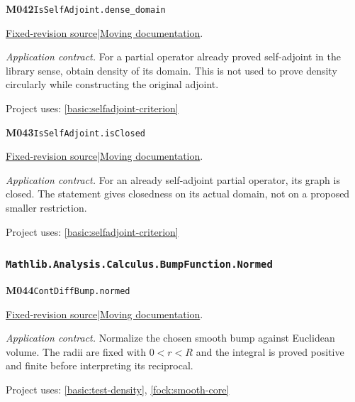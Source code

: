 \documentclass[11pt,a4paper]{article}
\theoremstyle{definition}
\theoremstyle{remark}
\begin{document}
\noindent\textbf{M042}\label{base:M042}\quad\nolinkurl{IsSelfAdjoint.dense_domain}

\href{https://github.com/leanprover-community/mathlib4/blob/9bac2d0692944a775113f7c130fd5e5b4608a854/Mathlib/Analysis/InnerProductSpace/LinearPMap.lean}{Fixed-revision source}\quad|\quad\href{https://leanprover-community.github.io/mathlib4_docs/Mathlib/Analysis/InnerProductSpace/LinearPMap.html#IsSelfAdjoint.dense_domain}{Moving documentation}.\par
\noindent\textit{Application contract.} For a partial operator already proved self-adjoint in the library sense, obtain density of its domain. This is not used to prove density circularly while constructing the original adjoint.\par
{\small Project uses: \ref{basic:selfadjoint-criterion}}\par\medskip

\noindent\textbf{M043}\label{base:M043}\quad\nolinkurl{IsSelfAdjoint.isClosed}

\href{https://github.com/leanprover-community/mathlib4/blob/9bac2d0692944a775113f7c130fd5e5b4608a854/Mathlib/Analysis/InnerProductSpace/LinearPMap.lean}{Fixed-revision source}\quad|\quad\href{https://leanprover-community.github.io/mathlib4_docs/Mathlib/Analysis/InnerProductSpace/LinearPMap.html#IsSelfAdjoint.isClosed}{Moving documentation}.\par
\noindent\textit{Application contract.} For an already self-adjoint partial operator, its graph is closed. The statement gives closedness on its actual domain, not on a proposed smaller restriction.\par
{\small Project uses: \ref{basic:selfadjoint-criterion}}\par\medskip

\subsubsection*{\nolinkurl{Mathlib.Analysis.Calculus.BumpFunction.Normed}}
\noindent\textbf{M044}\label{base:M044}\quad\nolinkurl{ContDiffBump.normed}

\href{https://github.com/leanprover-community/mathlib4/blob/9bac2d0692944a775113f7c130fd5e5b4608a854/Mathlib/Analysis/Calculus/BumpFunction/Normed.lean}{Fixed-revision source}\quad|\quad\href{https://leanprover-community.github.io/mathlib4_docs/Mathlib/Analysis/Calculus/BumpFunction/Normed.html#ContDiffBump.normed}{Moving documentation}.\par
\noindent\textit{Application contract.} Normalize the chosen smooth bump against Euclidean volume. The radii are fixed with $0<r<R$ and the integral is proved positive and finite before interpreting its reciprocal.\par
{\small Project uses: \ref{basic:test-density}, \ref{fock:smooth-core}}\par\medskip
\end{document}
